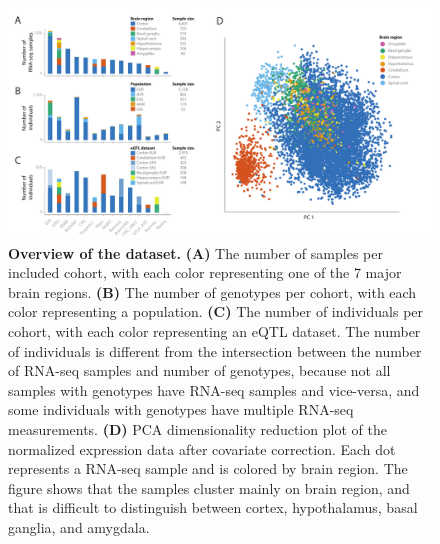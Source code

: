 \begin{figure}[H]
	\includegraphics[width=\textwidth]{chapters/chapter5-brain-eqtls/img/2021-02-11-fig2-datasetoverview-v7.pdf}
	\caption{\textbf{Overview of the dataset.} \textbf{(A)} The number of samples per included cohort, with each color representing one of the 7 major brain regions. \textbf{(B)} The number of genotypes per cohort, with each color representing a population. \textbf{(C)} The number of individuals per cohort, with each color representing an eQTL dataset. The number of individuals is different from the intersection between the number of RNA-seq samples and number of genotypes, because not all samples with genotypes have RNA-seq samples and vice-versa, and some individuals with genotypes have multiple RNA-seq measurements. \textbf{(D)} PCA dimensionality reduction plot of the normalized expression data after covariate correction. Each dot represents a RNA-seq sample and is colored by brain region. The figure shows that the samples cluster mainly on brain region, and that is difficult to distinguish between cortex, hypothalamus, basal ganglia, and amygdala.}
	\label{metabrain_fig2}
\end{figure}

